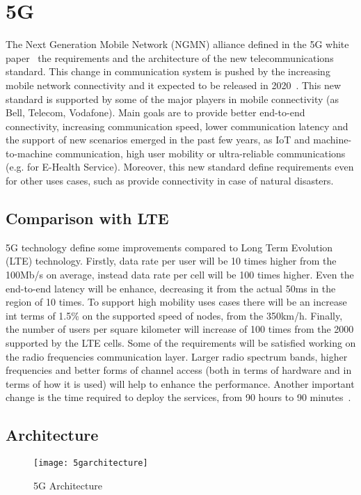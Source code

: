 \section{5G}
The Next Generation Mobile Network (NGMN) alliance defined in the 5G
white paper~\cite{alliance20155g} the
requirements and the architecture of the new telecommunications standard. 
This change in communication system is pushed by the increasing mobile network
connectivity and it expected to be released in 2020~\cite{iwamura2015ngmn}. This
new standard is supported by some of the major players in mobile connectivity 
(as Bell, Telecom, Vodafone). Main goals are to provide better end-to-end
connectivity, increasing communication speed, lower communication latency and
the support of new scenarios emerged in the past few years, as IoT and
machine-to-machine communication, high user mobility or ultra-reliable
communications (e.g. for E-Health Service). Moreover, this new standard define
requirements even for other uses cases, such as provide connectivity in case of
natural disasters. 

\subsection{Comparison with LTE}
5G technology define some improvements compared to Long Term Evolution (LTE)
technology. Firstly, data rate per user will be 10 times higher from the 100Mb/s
on average, instead data rate per cell will be 100 times higher. Even the
end-to-end latency will be enhance, decreasing it from the actual 50ms in the
region of 10 times. To support high mobility uses cases there will be an
increase int terms of 1.5\% on the supported speed of nodes, from the 350km/h.
Finally, the number of users per square kilometer will increase of 100 times
from the 2000 supported by the LTE cells. Some of the requirements will be
satisfied working on the radio frequencies communication layer. Larger radio
spectrum bands, higher frequencies and better forms of channel access (both in
terms of hardware and in terms of how it is used) will help to enhance the
performance. Another important change is the time required to deploy the
services,
from 90 hours to 90 minutes~\cite{networld20202014role}.

\subsection{Architecture}
\begin{figure}[t]
  \centering
  \texttt{[image: 5garchitecture]}
  \caption[5G Architecture]{5G Architecture~\cite{alliance20155g}}
  \label{chap:background:img:5garchitecture}
\end{figure}

